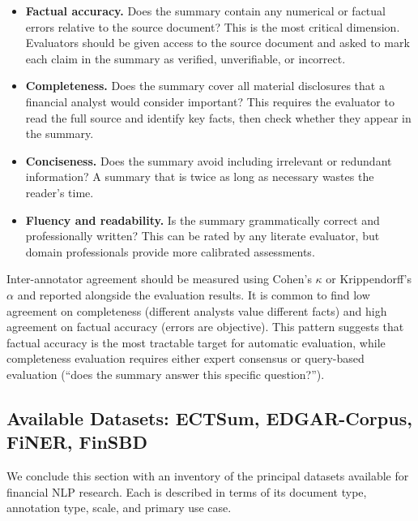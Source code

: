 \begin{itemize}
  \item \textbf{Factual accuracy.} Does the summary contain any numerical or factual
        errors relative to the source document? This is the most critical dimension.
        Evaluators should be given access to the source document and asked to mark each
        claim in the summary as verified, unverifiable, or incorrect.
  \item \textbf{Completeness.} Does the summary cover all material disclosures that a
        financial analyst would consider important? This requires the evaluator to read
        the full source and identify key facts, then check whether they appear in the
        summary.
  \item \textbf{Conciseness.} Does the summary avoid including irrelevant or redundant
        information? A summary that is twice as long as necessary wastes the reader's time.
  \item \textbf{Fluency and readability.} Is the summary grammatically correct and
        professionally written? This can be rated by any literate evaluator, but
        domain professionals provide more calibrated assessments.
\end{itemize}

Inter-annotator agreement should be measured using Cohen's $\kappa$ or Krippendorff's
$\alpha$ and reported alongside the evaluation results. It is common to find low
agreement on completeness (different analysts value different facts) and high agreement
on factual accuracy (errors are objective). This pattern suggests that factual accuracy
is the most tractable target for automatic evaluation, while completeness evaluation
requires either expert consensus or query-based evaluation (``does the summary answer
this specific question?'').

\subsection{Available Datasets: ECTSum, EDGAR-Corpus, FiNER, FinSBD}
\label{sec:ch14-available-datasets}

We conclude this section with an inventory of the principal datasets available for
financial NLP research. Each is described in terms of its document type, annotation
type, scale, and primary use case.


